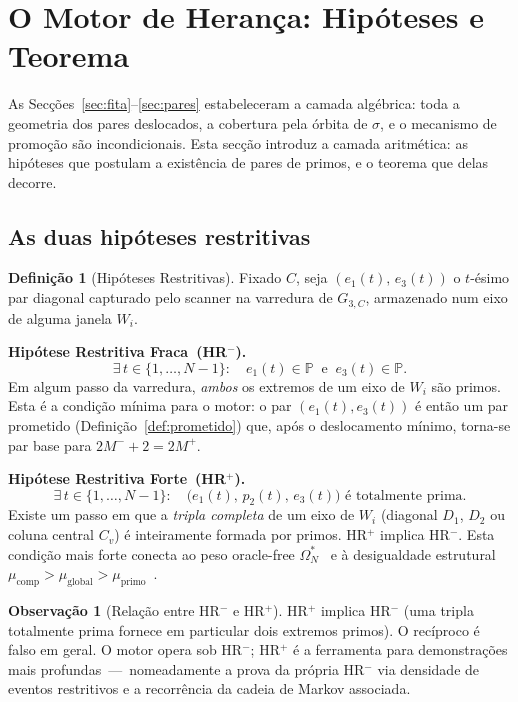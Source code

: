 \documentclass[12pt, a4paper]{article}
\theoremstyle{plain}
\theoremstyle{definition}
\newtheorem{definition}[theorem]{Definição}
\newtheorem{remark}[theorem]{Observação}
\theoremstyle{remark}
\begin{document}
	\section{O Motor de Herança: Hipóteses e Teorema}
	\label{sec:motor}
	
	As Secções~\ref{sec:fita}--\ref{sec:pares} estabeleceram a camada
	algébrica: toda a geometria dos pares deslocados, a cobertura pela
	órbita de $\sigma$, e o mecanismo de promoção são incondicionais.
	Esta secção introduz a camada aritmética: as hipóteses que postulam
	a existência de pares de primos, e o teorema que delas decorre.
	
	\subsection{As duas hipóteses restritivas}
	
	\begin{definition}[Hipóteses Restritivas]
		\label{def:HR}
		Fixado $C$, seja $(e_1(t),\,e_3(t))$ o $t$-ésimo par diagonal
		capturado pelo scanner na varredura de $G_{3,C}$, armazenado
		num eixo de alguma janela $W_i$.
		
		\medskip
		\textbf{Hipótese Restritiva Fraca~(HR$^-$).}
		\[
		\exists\, t\in\{1,\ldots,N-1\}:
		\quad e_1(t)\in\mathbb{P}
		\;\;\text{e}\;\;
		e_3(t)\in\mathbb{P}.
		\]
		Em algum passo da varredura, \emph{ambos} os extremos de um
		eixo de $W_i$ são primos.  Esta é a condição mínima para o motor:
		o par $(e_1(t),e_3(t))$ é então um par prometido
		(Definição~\ref{def:prometido}) que, após o deslocamento mínimo,
		torna-se par base para $2M^-+2=2M^+$.
		
		\medskip
		\textbf{Hipótese Restritiva Forte~(HR$^+$).}
		\[
		\exists\, t\in\{1,\ldots,N-1\}:
		\quad \bigl(e_1(t),\,p_2(t),\,e_3(t)\bigr)
		\text{ é totalmente prima.}
		\]
		Existe um passo em que a \emph{tripla completa} de um eixo de
		$W_i$ (diagonal $D_1$, $D_2$ ou coluna central $C_v$) é
		inteiramente formada por primos.  HR$^+$ implica HR$^-$.
		Esta condição mais forte conecta ao peso oracle-free
		$\Omega_N^*$~\cite{peso} e à desigualdade estrutural
		$\mu_{\text{comp}}>\mu_{\text{global}}>\mu_{\text{primo}}$~\cite{problemaB}.
	\end{definition}
	
	\begin{remark}[Relação entre HR$^-$ e HR$^+$]
		HR$^+$ implica HR$^-$ (uma tripla totalmente prima fornece em
		particular dois extremos primos).  O recíproco é falso em geral.
		O motor opera sob HR$^-$; HR$^+$ é a ferramenta para
		demonstrações mais profundas~---~nomeadamente a prova da própria
		HR$^-$ via densidade de eventos restritivos e a recorrência da
		cadeia de Markov associada.
	\end{remark}
	
\end{document}
